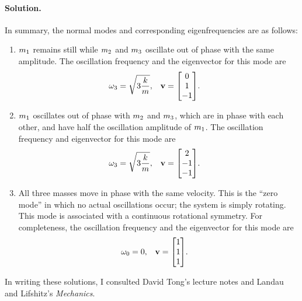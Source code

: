 \documentclass[11pt]{article}
\newenvironment{solution}
{
    \paragraph{Solution.}
    \ignorespaces
}
{
    \bigskip
}
\begin{document}
\begin{solution}
	In summary, the normal modes and corresponding eigenfrequencies are as follows:
	\renewcommand{\theenumi}{\alph{enumi}}
	\begin{enumerate}
		\item $m_1$ remains still while $m_2$ and $m_3$ oscillate out of phase with the same amplitude.  The oscillation frequency and the eigenvector for this mode are
			\begin{align}
				\ome &= \sqrt{3 \frac{k}{m}}, & \vv &= \mqty[0 \\ 1 \\ -1].
			\end{align}
		\item $m_1$ oscillates out of phase with $m_2$ and $m_3$, which are in phase with each other, and have half the oscillation amplitude of $m_1$.  The oscillation frequency and eigenvector for this mode are
			\begin{align}
				\ome &= \sqrt{3 \frac{k}{m}}, & \vv &= \mqty[2 \\ -1 \\ -1].
			\end{align}
		\item All three masses move in phase with the same velocity.  This is the ``zero mode'' in which no actual oscillations occur; the system is simply rotating.  This mode is associated with a continuous rotational symmetry.  For completeness, the oscillation frequency and the eigenvector for this mode are
			\begin{align}
				\omo &= 0, & \vv &= \mqty[1 \\ 1 \\ 1].
			\end{align}
	\end{enumerate}
\end{solution}

In writing these solutions, I consulted David Tong's lecture notes and Landau and Lifshitz's \emph{Mechanics}.
\end{document}
